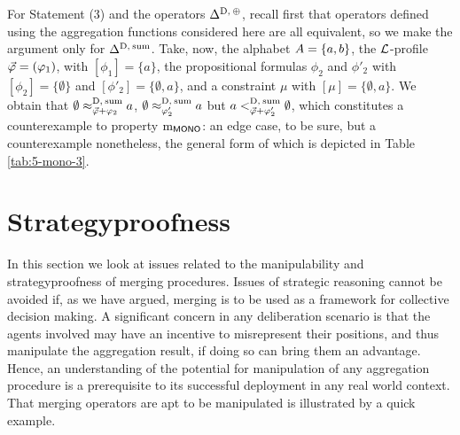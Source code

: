 \begin{prf*}{}{}
	For Statement (3) and the operators $\me^{\drastic,\:\agg}$,
	recall first that operators defined using the aggregation 
	functions considered here are all equivalent,
	so we make the argument only for $\me^{\drastic,\:\ssum}$.
	Take, now, the alphabet $\Atoms=\{a,b\}$,
	the $\L$-profile $\P=(\phi_1)$,
	with $[\phi_{1}]=\{a\}$, 
	the propositional formulas $\phi_{2}$ and $\phi'_{2}$
	with $[\phi_2]=\{\emptyset\}$ and $[\phi'_2]=\{\emptyset,a\}$,
	and a constraint $\mu$ with $[\mu]=\{\emptyset,a\}$.
	We obtain that $\emptyset\approx^{\drastic,\:\ssum}_{\P+\phi_2} a$,
	$\emptyset\approx^{\drastic,\:\ssum}_{\phi'_2} a$
	but $a<^{\drastic,\:\ssum}_{\P+\phi'_2} \emptyset$,
	which constitutes a counterexample to property $\oom{\MONO}$:
	an edge case, to be sure, but a counterexample nonetheless,
	the general form of which is depicted in Table \ref{tab:5-mono-3}.
\end{prf*}
















\section{Strategyproofness}\label{sec:5-strategyproofness}
In this section we look at issues related to the manipulability 
and strategyproofness of merging procedures.
Issues of strategic reasoning cannot be avoided
if, as we have argued, merging is to be used as a 
framework for collective decision making.
A significant concern in any deliberation scenario is that the agents 
involved may have an incentive to misrepresent their positions, 
and thus manipulate the aggregation result, 
if doing so can bring them an advantage.
Hence, an understanding of the potential 
for manipulation of any aggregation procedure is a 
prerequisite to its successful 
deployment in any real world context.
That merging operators are apt to be manipulated 
is illustrated by a quick example.

